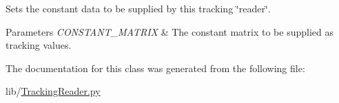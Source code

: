 \-Sets the constant data to be supplied by this tracking \char`\"{}reader\char`\"{}. 


\begin{DoxyParams}{\-Parameters}
{\em \-C\-O\-N\-S\-T\-A\-N\-T\-\_\-\-M\-A\-T\-R\-I\-X} & \-The constant matrix to be supplied as tracking values. \\
\hline
\end{DoxyParams}


\-The documentation for this class was generated from the following file\-:\begin{DoxyCompactItemize}
\item 
lib/\hyperlink{TrackingReader_8py}{\-Tracking\-Reader.\-py}\end{DoxyCompactItemize}
